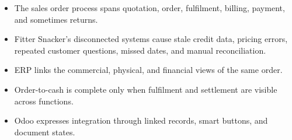 \begin{chapterrecap}
\begin{itemize}
  \item The sales order process spans quotation, order, fulfilment, billing, payment, and sometimes returns.
  \item Fitter Snacker's disconnected systems cause stale credit data, pricing errors, repeated customer questions, missed dates, and manual reconciliation.
  \item ERP links the commercial, physical, and financial views of the same order.
  \item Order-to-cash is complete only when fulfilment and settlement are visible across functions.
  \item Odoo expresses integration through linked records, smart buttons, and document states.
\end{itemize}
\end{chapterrecap}
